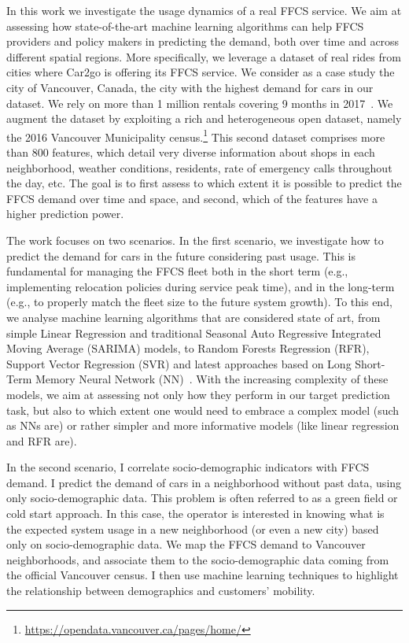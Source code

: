In this work we investigate the usage dynamics of a real FFCS service. We aim at assessing how state-of-the-art machine learning algorithms can help FFCS providers and policy makers in predicting the demand, both over time and across different spatial regions.
More specifically, we leverage a dataset of real rides from cities where Car2go is offering its FFCS service. We consider as a case study the city of Vancouver, Canada, the city with the highest demand for cars in our dataset. We rely on more than 1 million rentals covering 9 months in 2017~\citep{UMAP}.
We augment the dataset by exploiting a rich and heterogeneous open dataset, namely the 2016 Vancouver Municipality census.\footnote{\url{https://opendata.vancouver.ca/pages/home/}} 
This second dataset comprises more than 800 features, which detail very diverse information about shops in each neighborhood, weather conditions, residents, rate of emergency calls throughout the day, etc. The goal is to first assess to which extent it is possible to predict the FFCS demand over time and space, and second, which of the features have a higher prediction power.

The work focuses on two scenarios.
In the first scenario, we investigate how to predict the demand for cars in the future considering past usage.  This is fundamental for managing the FFCS fleet both in the short term (e.g., implementing relocation policies during service peak time), and in the long-term (e.g., to properly match the fleet size to the future system growth).
To this end, we analyse machine learning algorithms that are considered state of art, from simple Linear Regression and traditional Seasonal Auto Regressive Integrated Moving Average (SARIMA) models, to Random Forests Regression (RFR), Support Vector Regression (SVR) and latest approaches based on Long Short-Term Memory Neural Network (NN)~\citep{brockwell2016introduction,Bishop:2006}. With the increasing complexity of these models, we aim at assessing not only how they perform in our target prediction task, but also to which extent one would need to embrace a complex model (such as NNs are) or rather simpler and more informative models (like linear regression and RFR are).


In the second scenario, I correlate socio-demographic indicators with FFCS demand. 
I predict the demand of cars in a neighborhood without past data, using only socio-demographic data. 
This problem is often referred to as a green field or cold start approach. In this case, the operator is interested in knowing what is the expected system usage in a new neighborhood (or even a new city) based only on socio-demographic data. 
We map the FFCS demand to Vancouver neighborhoods, and associate them to the socio-demographic data coming from the official Vancouver census. I then use machine learning techniques to highlight the relationship between demographics and customers' mobility.  

